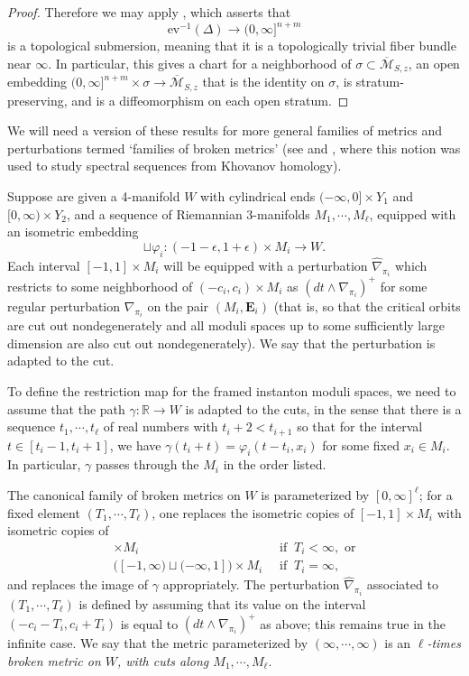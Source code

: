 \documentclass[10pt,a4paper]{amsart}
\theoremstyle{definition}
\theoremstyle{remark}
\numberwithin{figure}{qchap}
\begin{document}
\begin{proof}
Therefore we may apply \cite[Lemma~19.3.3]{KMSW}, which asserts that
$$\text{ev}^{-1}(\Delta) \to (0,\infty]^{n+m}$$
is a topological submersion, meaning that it is a topologically trivial fiber bundle near $\infty$. In particular, this gives a chart for a neighborhood of $\sigma \subset \overline{\mathcal M}_{S,z}$, an open embedding $(0,\infty]^{n+m} \times \sigma \to \overline{\mathcal M}_{S,z}$ that is the identity on $\sigma$, is stratum-preserving, and is a diffeomorphism on each open stratum.
\end{proof}

We will need a version of these results for more general families of metrics and perturbations termed `families of broken metrics' (see \cite{Dae} and \cite{KM3}, where this notion was used to study spectral sequences from Khovanov homology).

Suppose are given a 4-manifold $W$ with cylindrical ends $(-\infty, 0] \times Y_1$ and $[0, \infty) \times Y_2$, and a sequence of Riemannian 3-manifolds $M_1, \cdots, M_\ell$, equipped with an isometric embedding $$\sqcup \varphi_i: (-1-\epsilon, 1+\epsilon) \times M_i \to W.$$ Each interval $[-1, 1] \times M_i$ will be equipped with a perturbation $\widehat{\nabla}_{\pi_i}$ which restricts to some neighborhood of $(-c_i, c_i) \times M_i$ as $(dt \wedge \nabla_{\pi_i})^+$ for some regular perturbation $\nabla_{\pi_i}$ on the pair $(M_i, \mathbf{E}_i)$ (that is, so that the critical orbits are cut out nondegenerately and all moduli spaces up to some sufficiently large dimension are also cut out nondegenerately). We say that the perturbation is adapted to the cut.

To define the restriction map for the framed instanton moduli spaces, we need to assume that the path $\gamma: \mathbb R \to W$ is adapted to the cuts, in the sense that there is a sequence $t_1, \cdots, t_\ell$ of real numbers with $t_i +2 < t_{i+1}$ so that for the interval $t \in [t_i-1, t_i+1]$, we have $\gamma(t_i+t) = \varphi_i(t-t_i, x_i)$ for some fixed $x_i \in M_i$. In particular, $\gamma$ passes through the $M_i$ in the order listed.

The canonical family of broken metrics on $W$ is parameterized by $[0, \infty]^\ell$; for a fixed element $(T_1, \cdots, T_\ell)$, one replaces the isometric copies of $[-1, 1] \times M_i$ with isometric copies of
\begin{align*}[-1-T_i, 1+T_i] \times M_i \;\; &\text{if} \;\; T_i < \infty, \text{ or}\\
\Big([-1,\infty) \sqcup (-\infty, 1]\Big) \times M_i \;\; &\text{if} \;\; T_i = \infty,
\end{align*}
and replaces the image of $\gamma$ appropriately. The perturbation $\widehat{\nabla}_{\pi_i}$ associated to $(T_1, \cdots, T_\ell)$ is defined by assuming that its value on the interval $(-c_i - T_i, c_i+T_i)$ is equal to $(dt \wedge \nabla_{\pi_i})^+$ as above; this remains true in the infinite case. We say that the metric parameterized by $(\infty, \cdots, \infty)$ is an \emph{$\ell$-times broken metric on $W$, with cuts along $M_1, \cdots, M_\ell$}.
\end{document}
